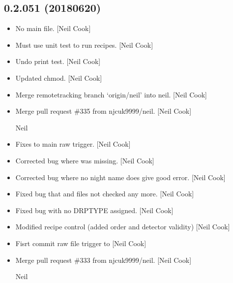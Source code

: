\documentclass[a4paper,10pt,english]{report}
\begin{document}
\subsection{0.2.051 (2018\sphinxhyphen{}06\sphinxhyphen{}20)}
\label{\detokenize{misc/changelog:id433}}\begin{itemize}
\item {} 
No main file. {[}Neil Cook{]}

\item {} 
Must use unit test to run recipes. {[}Neil Cook{]}

\item {} 
Undo print test. {[}Neil Cook{]}

\item {} 
Updated chmod. {[}Neil Cook{]}

\item {} 
Merge remote\sphinxhyphen{}tracking branch ‘origin/neil’ into neil. {[}Neil Cook{]}

\item {} 
Merge pull request \#335 from njcuk9999/neil. {[}Neil Cook{]}

Neil

\item {} 
Fixes to main raw trigger. {[}Neil Cook{]}

\item {} 
Corrected bug where  was missing. {[}Neil Cook{]}

\item {} 
Corrected bug where no night name does give good error. {[}Neil Cook{]}

\item {} 
Fixed bug that  and files not checked any more. {[}Neil
Cook{]}

\item {} 
Fixed bug with no DRPTYPE assigned. {[}Neil Cook{]}

\item {} 
Modified recipe control (added order and detector validity) {[}Neil
Cook{]}

\item {} 
Fisrt commit \sphinxhyphen{} raw file trigger  to  {[}Neil Cook{]}

\item {} 
Merge pull request \#333 from njcuk9999/neil. {[}Neil Cook{]}

Neil

\end{itemize}
\end{document}

